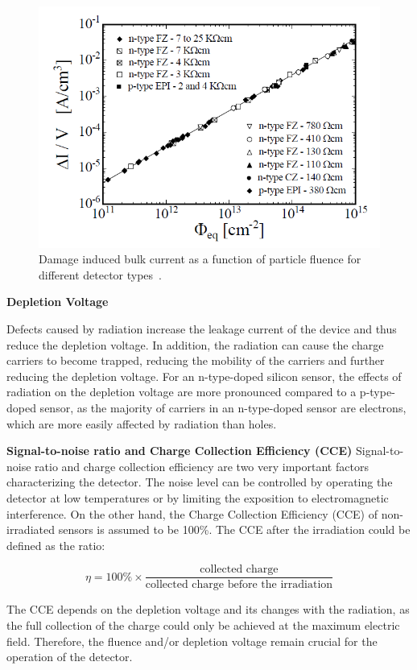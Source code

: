 \begin{figure}[!h]
\centering
\includegraphics[width=0.75\columnwidth]{Chapter2/images/lekage_current_fluence.png}
\caption{Damage induced bulk current as a function of particle fluence
for different detector types~\cite{Moll:1999kv}.}
\label{fig_leakage_theory}
\end{figure}
\textbf{Depletion Voltage}\bigbreak

Defects caused by radiation increase the leakage current of the device and thus reduce the depletion voltage. In addition, the radiation can cause the charge carriers to become trapped, reducing the mobility of the carriers and further reducing the depletion voltage. For an n-type-doped silicon sensor, the effects of radiation on the depletion voltage are more pronounced compared to a p-type-doped sensor, as the majority of carriers in an n-type-doped sensor are electrons, which are more easily affected by radiation than holes.  \bigbreak

\textbf{Signal-to-noise ratio and Charge Collection Efficiency (CCE)}\bigbreak
Signal-to-noise ratio and charge collection efficiency are two very important factors characterizing the detector. The noise level can be controlled by operating the detector at low temperatures or by limiting the exposition to electromagnetic interference. On the other hand, the Charge Collection Efficiency (CCE) of non-irradiated sensors is assumed to be 100\%. The CCE after the irradiation could be defined as the ratio:

\begin{equation}
    \eta = 100\%\times\frac{\text{collected charge}}{\text{collected charge before the irradiation}}
\end{equation}

The CCE depends on the depletion voltage and its changes with the radiation, as the full collection of the charge could only be achieved at the maximum electric field. Therefore, the fluence and/or depletion voltage remain crucial for the operation of the detector. 

